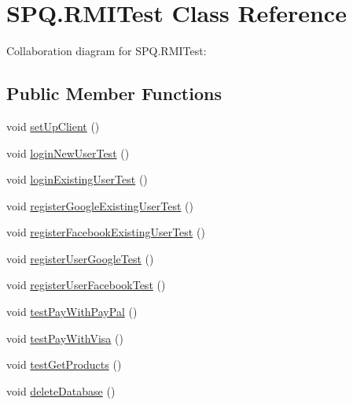 \hypertarget{class_s_p_q_1_1_r_m_i_test}{}\section{S\+P\+Q.\+R\+M\+I\+Test Class Reference}
\label{class_s_p_q_1_1_r_m_i_test}


Collaboration diagram for S\+P\+Q.\+R\+M\+I\+Test\+:
\subsection*{Public Member Functions}
\begin{DoxyCompactItemize}
\item 
void \mbox{\hyperlink{class_s_p_q_1_1_r_m_i_test_a7ec13d55d5cb3716468c3e9d7b5740d3}{set\+Up\+Client}} ()
\item 
void \mbox{\hyperlink{class_s_p_q_1_1_r_m_i_test_a07409afe054b3fd3ee0481236e45b680}{login\+New\+User\+Test}} ()
\item 
void \mbox{\hyperlink{class_s_p_q_1_1_r_m_i_test_a0e9430910652b8ebeb99d2e871476ff1}{login\+Existing\+User\+Test}} ()
\item 
void \mbox{\hyperlink{class_s_p_q_1_1_r_m_i_test_ad375aaea37b3b8f68c670f4c09834a7b}{register\+Google\+Existing\+User\+Test}} ()
\item 
void \mbox{\hyperlink{class_s_p_q_1_1_r_m_i_test_aebfcce491b9fa13cafa971bac73f88b8}{register\+Facebook\+Existing\+User\+Test}} ()
\item 
void \mbox{\hyperlink{class_s_p_q_1_1_r_m_i_test_a18c26a1a1882c74b0ff9a0142c9492c8}{register\+User\+Google\+Test}} ()
\item 
void \mbox{\hyperlink{class_s_p_q_1_1_r_m_i_test_aaba807356f43d06d07e10da5ce5a53c6}{register\+User\+Facebook\+Test}} ()
\item 
void \mbox{\hyperlink{class_s_p_q_1_1_r_m_i_test_a15a72e3572c99f10ba0ac5b0368f1a02}{test\+Pay\+With\+Pay\+Pal}} ()
\item 
void \mbox{\hyperlink{class_s_p_q_1_1_r_m_i_test_afc93d812f0763a7bd63583e6a573f024}{test\+Pay\+With\+Visa}} ()
\item 
void \mbox{\hyperlink{class_s_p_q_1_1_r_m_i_test_afd1616ccf97ef054e05f3ca90d22753e}{test\+Get\+Products}} ()
\item 
void \mbox{\hyperlink{class_s_p_q_1_1_r_m_i_test_a38f0b0aa6d0cf1cf8f5bf3960b75954e}{delete\+Database}} ()
\end{DoxyCompactItemize}
